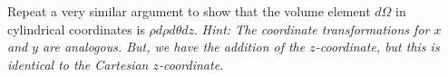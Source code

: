 \documentclass[12pt]{article} %
\begin{document}
\vspace*{1cm}
\begin{problem}
    Repeat a very similar argument to show that the volume element $d\Omega$ in cylindrical coordinates is $\rho d\rho d\theta dz$.  \emph{Hint: The coordinate transformations for $x$ and $y$ are analogous.  But, we have the addition of the $z$-coordinate, but this is identical to the Cartesian $z$-coordinate.}
\end{problem}
\end{document}
